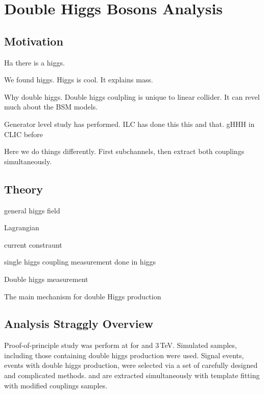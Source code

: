 \chapter{Double Higgs Bosons Analysis}
\label{chap:DoubleHiggs}

\section{Motivation}

Ha there is a higgs.

We found higgs. Higgs is cool. It explains mass.

Why double higgs. Double higgs coulpling is unique to linear collider. It can revel much about the BSM models.

Generator level study has performed. ILC has done this this and that. gHHH in CLIC before

Here we do things differently. First subchannels, then extract both couplings simultaneously.

\section{Theory}

general higgs field

Lagrangian

current constraunt

single higgs coupling measurement done in higgs

Double higgs measurement

The main mechanism for double Higgs production %

\section{Analysis Straggly Overview}

Proof-of-principle study was perform at \CLIC for  and 3\,TeV. Simulated samples, including those containing double higgs production were used. Signal events, events with double higgs production, were selected via a set of carefully designed and complicated methods. \gHHH and \gWWHH are extracted simultaneously with template fitting with modified couplings samples.
